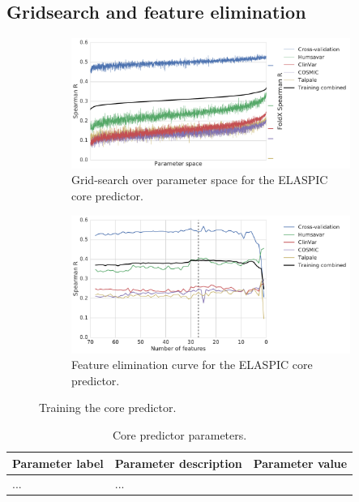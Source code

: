 \subsection{Gridsearch and feature elimination}

\begin{figure}[ht]
	\centering

	\begin{subfigure}[b]{1.0\textwidth}
		\centering
		\includegraphics[width=0.6\linewidth]{static/elaspic_training_set/machine_learning/gridsearch_core.pdf}
		\caption{Grid-search over parameter space for the ELASPIC core predictor.}
		\label{fig:gridsearch_core}
	\end{subfigure}

	\begin{subfigure}[b]{1\textwidth}
		\centering
		\includegraphics[width=0.75\linewidth]{static/elaspic_training_set/machine_learning/feature_elimination_core.pdf}
		\caption{Feature elimination curve for the ELASPIC core predictor.}
		\label{fig:feature_elimination_core}
	\end{subfigure}

	\caption[Core predictor training.]{Training the core predictor.}
\end{figure}


\begin{table}[ht]
\caption{Core predictor parameters.} \label{tab:core_parameters}
\begin{tabular}{l | l | l}
	\toprule
	Parameter label & Parameter description & Parameter value \\
	\midrule
	... & ... \\
	\bottomrule
\end{tabular}
\end{table}


